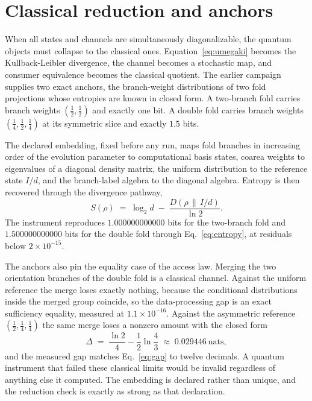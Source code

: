 \documentclass[aps,prd,reprint,nofootinbib,longbibliography]{revtex4-2}
\begin{document}
\section{Classical reduction and anchors}
\label{sec:classical}

When all states and channels are simultaneously diagonalizable, the quantum
objects must collapse to the classical ones.  Equation~\eqref{eq:umegaki}
becomes the Kullback-Leibler divergence, the channel becomes a stochastic
map, and consumer equivalence becomes the classical quotient.  The earlier
campaign supplies two exact anchors, the branch-weight distributions of two
fold projections whose entropies are known in closed form.  A two-branch
fold carries branch weights $(\tfrac12,\tfrac12)$ and exactly one bit.  A
double fold carries branch weights $(\tfrac14,\tfrac12,\tfrac14)$ at its
symmetric slice and exactly $1.5$ bits.

The declared embedding, fixed before any run, maps fold branches in
increasing order of the evolution parameter to computational basis states,
coarea weights to eigenvalues of a diagonal density matrix, the uniform
distribution to the reference state $I/d$, and the branch-label algebra to
the diagonal algebra.  Entropy is then recovered through the divergence
pathway,
\begin{equation}
S(\rho) \;=\; \log_2 d \;-\; \frac{D(\rho\,\|\,I/d)}{\ln 2}.
\label{eq:entropy}
\end{equation}
The instrument reproduces $1.000000000000$ bits for the two-branch fold and
$1.500000000000$ bits for the double fold through
Eq.~\eqref{eq:entropy}, at residuals below $2\times 10^{-15}$.

The anchors also pin the equality case of the access law.  Merging the two
orientation branches of the double fold is a classical channel.  Against
the uniform reference the merge loses exactly nothing, because the
conditional distributions inside the merged group coincide, so the
data-processing gap is an exact sufficiency equality, measured at
$1.1\times 10^{-16}$.  Against the asymmetric reference
$(\tfrac12,\tfrac14,\tfrac14)$ the same merge loses a nonzero amount with
the closed form
\begin{equation}
\Delta \;=\; \frac{\ln 2}{4}-\frac{1}{2}\ln\frac{4}{3}
\;\approx\; 0.029446\ \text{nats},
\label{eq:gap}
\end{equation}
and the measured gap matches Eq.~\eqref{eq:gap} to twelve decimals.  A
quantum instrument that failed these classical limits would be invalid
regardless of anything else it computed.  The embedding is declared rather
than unique, and the reduction check is exactly as strong as that
declaration.
\end{document}

